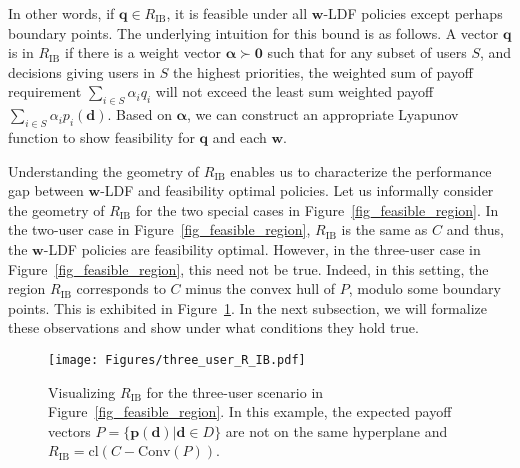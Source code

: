 \documentclass[prodmode,acmtompecs]{acmsmall}
\newcommand{\reqvec}{\mathbf{q}}
\newcommand{\reqscalar}{q}
\newcommand{\ribvec}{\boldsymbol{\alpha}}
\newcommand{\ribscalar}{\alpha}
\newcommand{\myComments}[1]{}
\newif\ifinfocom
\newif\ifextended
\newif\ifdissertation
\newcommand{\infocomStart}{\ifinfocom \myComments{Infocom: }}
\newcommand{\extendedStart}{\ifextended  \myComments{Extended version: }}
\newcommand{\dissertationStart}{\ifdissertation  \myComments{Dissertation version: }}
\newcommand{\commentEnd}{\myComments{End}}
\newcommand{\add}[1]{#1}
\begin{document}
In other words, if $\reqvec\in R_{\text{IB}}$, it is feasible under all $\mathbf{w}$-LDF policies except perhaps boundary points. 
The underlying intuition for this bound is as follows. A vector $\reqvec$ is in $R_\text{IB}$ if
there is a weight vector $\ribvec \succ \mathbf{0}$ such that for any subset of users $S$, and decisions giving users in $S$ the highest priorities, the weighted sum of payoff requirement $\sum\limits_{i \in S}\ribscalar_i \reqscalar_i$ will not exceed the least sum weighted payoff $\sum\limits_{i\in S} {\ribscalar}_i p_i(\mathbf{d})$. 
Based on $\ribvec$, we can construct an appropriate Lyapunov function to show feasibility for $\reqvec$ and each $\mathbf{w}$. 
\infocomStart
See the extended version of this paper \cite{EXT2} for the proof. 
\commentEnd\fi
\extendedStart
See Appendix \ref{appendix_pf_thm_R_IB_chap2} for the proof. 
\commentEnd\fi

\dissertationStart
In other words, $\reqvec\in R_{\text{IB}}$ and is feasible under the $\mathbf{w}$-LDF policy if there is a weight vector $\ribvec \succ \mathbf{0}$ such that for any subset of users $S$, by giving users in $S$ the highest priorities, the weighted sum of payoff requirement $\sum\limits_{i \in S}\ribscalar_i \reqscalar_i$ will not exceed the least sum weighted payoff $\sum\limits_{i\in S} {\ribscalar}_i p_i(\mathbf{d})$. 
\commentEnd\fi

Understanding the geometry of $R_\text{IB}$ enables us to characterize the performance gap between $\mathbf{w}$-LDF and feasibility optimal policies. 
Let us informally consider the geometry of $R_\text{IB}$ for the two special cases in Figure~{\ref{fig_feasible_region}}. 
In the two-user case in Figure~{\ref{fig_feasible_region}}, $R_\text{IB}$ is the same as $C$ and thus, the $\mathbf{w}$-LDF policies are feasibility optimal. 
However, in the three-user case in Figure~{\ref{fig_feasible_region}}, this need not be true. 
Indeed, in this setting, the region $R_\text{IB}$ corresponds to $C$ minus the convex hull of $P$, modulo some boundary points. 
This is exhibited in Figure~{\ref{fig_three_user_R_IB}}. 
In the next subsection, we will formalize these observations and show under what conditions they hold true. 

\begin{figure}[htp]
  \centering
  \texttt{[image: Figures/three\_user\_R\_IB.pdf]}
  \caption{Visualizing $R_{\text{IB}}$ for the three-user scenario in Figure~{\ref{fig_feasible_region}}. \add{In this example, the expected payoff vectors $P = \{\mathbf{p}(\mathbf{d}) | \mathbf{d} \in D \}$ are not on the same hyperplane} and $R_{\text{IB}} = \text{cl}(C - \text{Conv}(P))$. }
  \label{fig_three_user_R_IB}
\end{figure}
\end{document}

